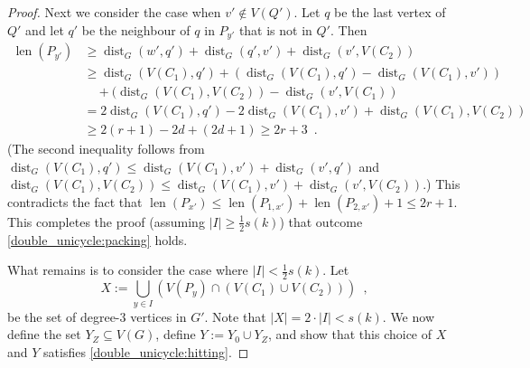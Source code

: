 \documentclass{patmorin}
\newcommand{\gwen}[1]{\textcolor{Purple}{Gwen: #1}}
\newcommand{\piotr}[1]{\textcolor{red}{Piotr: #1}}
\DeclareMathOperator{\len}{len}
\DeclareMathOperator{\dist}{dist}
\begin{document}
\begin{proof}
    Next we consider the case when $v'\notin V(Q')$.
    Let $q$ be the last vertex of $Q'$ and let $q'$ be the neighbour of $q$ in $P_{y'}$ that is not in $Q'$.  Then
    \begin{align*}
    \len(P_{y'})
        & \ge \dist_G(w',q') + \dist_G(q',v') + \dist_G(v',V(C_2)) \\
        & \ge \dist_G(V(C_1),q') + (\dist_G(V(C_1),q') - \dist_G(V(C_1),v')) \\
        & \quad {} + (\dist_G(V(C_1),V(C_2))-\dist_G(v',V(C_1)) \\
        & = 2\dist_G(V(C_1),q') - 2\dist_G(V(C_1),v') + \dist_G(V(C_1),V(C_2)) \\
        & \geq 2(r+1) - 2d + (2d+1) \geq 2r+3 \enspace .
    \end{align*}
    (The second inequality follows from $\dist_G(V(C_1),q')\leq \dist_G(V(C_1),v')+\dist_G(v',q')$ and
    $\dist_G(V(C_1),V(C_2))\le \dist_G(V(C_1),v')+\dist_G(v',V(C_2))$.) This contradicts the fact that $\len(P_{x'})\le \len(P_{1,x'})+\len(P_{2,x'})+1\le 2r+1$.  This completes the proof (assuming $|I|\ge\tfrac{1}{2}s(k)$) that outcome \cref{double_unicycle:packing} holds.


    What remains is to consider the case where $|I|<\frac{1}{2}s(k)$.  Let 
    \[ 
      \textstyle X:=\bigcup_{y\in I}\left( V(P_y)\cap(V(C_1)\cup V(C_2))\right) \enspace , 
    \]
    be the set of degree-$3$ vertices in $G'$.
    Note that $|X| = 2\cdot|I| < s(k)$.
    We now define the set $Y_Z\subseteq V(G)$, define $Y:=Y_0\cup Y_Z$, and show that this choice of $X$ and $Y$ satisfies \cref{double_unicycle:hitting}.


\end{proof}
\end{document}
